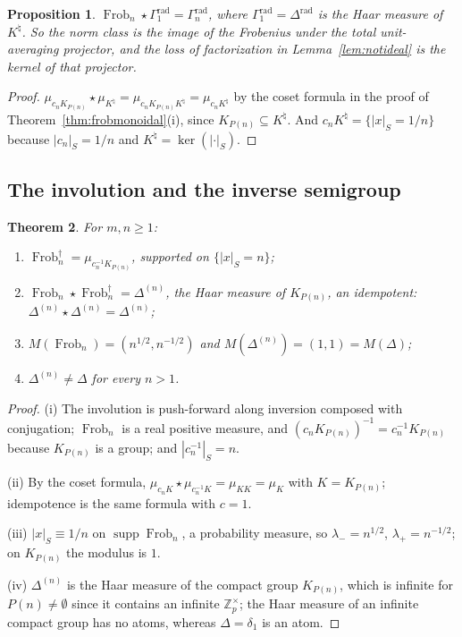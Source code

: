\documentclass[11pt]{amsart}
\newtheorem{theorem}{Theorem}[section]
\newtheorem{proposition}[theorem]{Proposition}
\theoremstyle{definition}
\theoremstyle{remark}
\newcommand{\Z}{\mathbb Z}
\newcommand{\Frob}{\operatorname{Frob}}
\newcommand{\supp}{\operatorname{supp}}
\newcommand{\Knat}{K^{\natural}}
\begin{document}
\begin{proposition}\label{prop:avgtorad}
$\Frob_n\star\Gamma_1^{\mathrm{rad}}=\Gamma_n^{\mathrm{rad}}$, where
$\Gamma_1^{\mathrm{rad}}=\Delta^{\mathrm{rad}}$ is the Haar measure of
$\Knat$. So the norm class is the image of the Frobenius under the total
unit-averaging projector, and the loss of factorization in
Lemma~\ref{lem:notideal} is the kernel of that projector.
\end{proposition}

\begin{proof}
$\mu_{c_nK_{P(n)}}\star\mu_{\Knat}=\mu_{c_nK_{P(n)}\Knat}=\mu_{c_n\Knat}$ by
the coset formula in the proof of Theorem~\ref{thm:frobmonoidal}(i), since
$K_{P(n)}\subseteq\Knat$. And $c_n\Knat=\{|x|_S=1/n\}$ because $|c_n|_S=1/n$
and $\Knat=\ker(|\cdot|_S)$.
\end{proof}

\subsection{The involution and the inverse semigroup}

\begin{theorem}\label{thm:frobdagger}
For $m,n\ge1$:
\begin{enumerate}
\item[(i)] $\Frob_n^\dagger=\mu_{c_n^{-1}K_{P(n)}}$, supported on
$\{|x|_S=n\}$;
\item[(ii)] $\Frob_n\star\Frob_n^\dagger=\Delta^{(n)}$, the Haar measure of
$K_{P(n)}$, an idempotent:
$\Delta^{(n)}\star\Delta^{(n)}=\Delta^{(n)}$;
\item[(iii)] $M(\Frob_n)=(n^{1/2},n^{-1/2})$ and
$M(\Delta^{(n)})=(1,1)=M(\Delta)$;
\item[(iv)] $\Delta^{(n)}\ne\Delta$ for every $n>1$.
\end{enumerate}
\end{theorem}

\begin{proof}
(i) The involution is push-forward along inversion composed with conjugation;
$\Frob_n$ is a real positive measure, and $(c_nK_{P(n)})^{-1}
=c_n^{-1}K_{P(n)}$ because $K_{P(n)}$ is a group; and $|c_n^{-1}|_S=n$.

(ii) By the coset formula,
$\mu_{c_nK}\star\mu_{c_n^{-1}K}=\mu_{KK}=\mu_K$ with $K=K_{P(n)}$;
idempotence is the same formula with $c=1$.

(iii) $|x|_S\equiv1/n$ on $\supp\Frob_n$, a probability measure, so
$\lambda_-=n^{1/2}$, $\lambda_+=n^{-1/2}$; on $K_{P(n)}$ the modulus is $1$.

(iv) $\Delta^{(n)}$ is the Haar measure of the compact group $K_{P(n)}$, which
is infinite for $P(n)\ne\emptyset$ since it contains an infinite $\Z_p^\times$;
the Haar measure of an infinite compact group has no atoms, whereas
$\Delta=\delta_1$ is an atom.
\end{proof}
\end{document}
